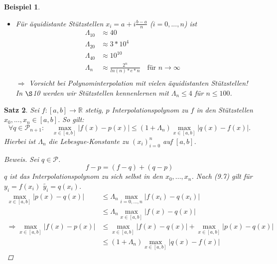 \documentclass[12pt]{article}
\theoremstyle{break}
\newtheorem{theorem}{Satz}[subsection]
\newtheorem{example}[theorem]{Beispiel}
\begin{document}
\begin{example}
\begin{description}\item \end{description}
\begin{itemize}
  \item Für äquidistante Stützstellen $x_i = a + i\frac{b-a}{n}$ ($i=0,...,n$) ist 
    \begin{align*}
    \Lambda_{10} &\approx 40 &\\
    \Lambda_{20} &\approx 3*10^4 &\\
    \Lambda_{40} &\approx 10^{10} &\\
    \Lambda_{n} &\approx \frac{2^n}{ln(n)*e*n} \quad \text{für } n \rightarrow \infty&\\
    \end{align*}
    $\Rightarrow$ Vorsicht bei Polynominterpolation mit vielen äquidistanten Stützstellen! \\
    In $\S$10 werden wir Stützstellen kennenlernen mit $\Lambda_n \leq 4$ für $n \leq 100$.
\end{itemize}
\end{example}

\begin{theorem}
Sei $f: [a,b] \rightarrow \mathbb{R}$ stetig, $p$ Interpolationspolynom zu $f$ in den Stützstellen $x_0,..., x_n \in [a,b]$. So gilt:
\[ \forall q \in \mathcal{P}_{n+1}: \quad \max_{x \in [a,b] } \vert f(x) -p(x) \vert \leq (1+ \Lambda_n) \max_{x \in [a,b]} \vert q(x) - f(x) \vert .\]
Hierbei ist $\Lambda_n$ die Lebesgue-Konstante zu $(x_i)_{i=0}^n$ auf $[a,b]$.
\begin{proof}[Beweis]
Sei $q \in \mathcal{P}$.
\[ f-p = (f-q) + (q-p)\]
$q$ ist das Interpolationspolynom zu sich selbst in den $x_0,..., x_n$. Nach (9.7) gilt für $y_i = f(x_i)$ $\tilde{y_i}  = q(x_i)$.
\begin{align*}
\max_{x \in [a,b]} \vert p(x) - q(x) \vert &\leq \Lambda_n \max_{i=0,...,n} \vert f(x_i) - q(x_i) \vert &\\
&\leq \Lambda_n \max_{x \in [a,b]} \vert f(x)-q(x) \vert &\\
\Rightarrow \max_{x \in [a,b]} \vert f(x) - p(x) \vert &\leq \max_{x \in [a,b]} \vert f(x)-q(x) \vert + \max_{x \in [a,b]} \vert p(x)-q(x) \vert &\\
&\leq (1+ \Lambda_n) \max_{x \in [a,b]} \vert q(x) - f(x) \vert 
\end{align*}
\end{proof}
\end{theorem}
\end{document}
